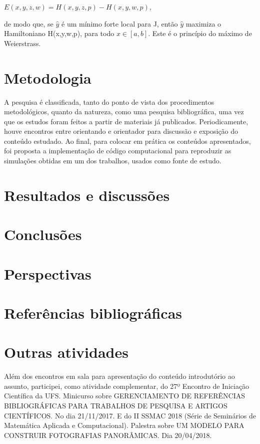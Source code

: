 \documentclass[12pt, a4paper]{article}
\begin{document}
\begin{center}
$E(x,y,z,w)=H(x,y,z,p)-H(x,y,w,p)$,
\end{center}

de modo que, se $\hat{y}$ é um mínimo forte local para J, então $\hat{y}$ maximiza o Hamiltoniano H(x,y,w,p), para todo $x \in [a,b]$. Este é o princípio do máximo de Weierstrass.


\newpage

\section{Metodologia}

A pesquisa é classificada, tanto do ponto de vista dos procedimentos metodológicos, quanto da natureza, como uma pesquisa bibliográfica, uma vez que os estudos foram feitos a partir de materiais já publicados. Periodicamente, houve encontros entre orientando e orientador para discussão e exposição do conteúdo estudado. Ao final, para colocar em prática os conteúdos apresentados, foi proposta a implementação de código computacional para reproduzir as simulações obtidas em um dos trabalhos, usados como fonte de estudo.
\cite{Burns2014}
\newpage

\section{Resultados e discussões }
\section{Conclusões}
\section{Perspectivas}

\newpage

\section{Referências bibliográficas}

	
\newpage

\section{Outras atividades}
Além dos encontros em sala para apresentação do conteúdo introdutório ao assunto,
participei, como atividade complementar, do 27º Encontro de Iniciação Científica da UFS.
Minicurso sobre GERENCIAMENTO DE REFERÊNCIAS BIBLIOGRÁFICAS PARA
TRABALHOS DE PESQUISA E ARTIGOS CIENTÍFICOS. No dia 21/11/2017. E do II SSMAC 2018 (Série de Seminários de Matemática Aplicada e Computacional). Palestra sobre UM MODELO PARA CONSTRUIR FOTOGRAFIAS PANORÂMICAS. Dia 20/04/2018.\
\end{document}
